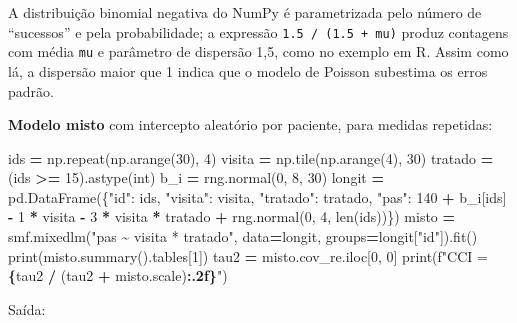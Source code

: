 \documentclass[
]{book}
\newenvironment{Shaded}{\begin{snugshade}}{\end{snugshade}}
\newcommand{\BuiltInTok}[1]{#1}
\newcommand{\DecValTok}[1]{\textcolor[rgb]{0.00,0.00,0.81}{#1}}
\newcommand{\NormalTok}[1]{#1}
\newcommand{\OperatorTok}[1]{\textcolor[rgb]{0.81,0.36,0.00}{\textbf{#1}}}
\newcommand{\SpecialCharTok}[1]{\textcolor[rgb]{0.81,0.36,0.00}{\textbf{#1}}}
\newcommand{\SpecialStringTok}[1]{\textcolor[rgb]{0.31,0.60,0.02}{#1}}
\newcommand{\StringTok}[1]{\textcolor[rgb]{0.31,0.60,0.02}{#1}}
\begin{document}
A distribuição binomial negativa do NumPy é parametrizada pelo número de ``sucessos'' e pela probabilidade; a expressão \texttt{1.5\ /\ (1.5\ +\ mu)} produz contagens com média \texttt{mu} e parâmetro de dispersão 1,5, como no exemplo em R. Assim como lá, a dispersão maior que 1 indica que o modelo de Poisson subestima os erros padrão.

\textbf{Modelo misto} com intercepto aleatório por paciente, para medidas repetidas:

\begin{Shaded}
\begin{Highlighting}[]
\NormalTok{ids }\OperatorTok{=}\NormalTok{ np.repeat(np.arange(}\DecValTok{30}\NormalTok{), }\DecValTok{4}\NormalTok{)}
\NormalTok{visita }\OperatorTok{=}\NormalTok{ np.tile(np.arange(}\DecValTok{4}\NormalTok{), }\DecValTok{30}\NormalTok{)}
\NormalTok{tratado }\OperatorTok{=}\NormalTok{ (ids }\OperatorTok{\textgreater{}=} \DecValTok{15}\NormalTok{).astype(}\BuiltInTok{int}\NormalTok{)}
\NormalTok{b\_i }\OperatorTok{=}\NormalTok{ rng.normal(}\DecValTok{0}\NormalTok{, }\DecValTok{8}\NormalTok{, }\DecValTok{30}\NormalTok{)}
\NormalTok{longit }\OperatorTok{=}\NormalTok{ pd.DataFrame(\{}\StringTok{"id"}\NormalTok{: ids, }\StringTok{"visita"}\NormalTok{: visita, }\StringTok{"tratado"}\NormalTok{: tratado,}
                       \StringTok{"pas"}\NormalTok{: }\DecValTok{140} \OperatorTok{+}\NormalTok{ b\_i[ids] }\OperatorTok{{-}} \DecValTok{1} \OperatorTok{*}\NormalTok{ visita }\OperatorTok{{-}} \DecValTok{3} \OperatorTok{*}\NormalTok{ visita }\OperatorTok{*}\NormalTok{ tratado}
                              \OperatorTok{+}\NormalTok{ rng.normal(}\DecValTok{0}\NormalTok{, }\DecValTok{4}\NormalTok{, }\BuiltInTok{len}\NormalTok{(ids))\})}
\NormalTok{misto }\OperatorTok{=}\NormalTok{ smf.mixedlm(}\StringTok{"pas \textasciitilde{} visita * tratado"}\NormalTok{, data}\OperatorTok{=}\NormalTok{longit, groups}\OperatorTok{=}\NormalTok{longit[}\StringTok{"id"}\NormalTok{]).fit()}
\BuiltInTok{print}\NormalTok{(misto.summary().tables[}\DecValTok{1}\NormalTok{])}
\NormalTok{tau2 }\OperatorTok{=}\NormalTok{ misto.cov\_re.iloc[}\DecValTok{0}\NormalTok{, }\DecValTok{0}\NormalTok{]}
\BuiltInTok{print}\NormalTok{(}\SpecialStringTok{f"CCI = }\SpecialCharTok{\{}\NormalTok{tau2 }\OperatorTok{/}\NormalTok{ (tau2 }\OperatorTok{+}\NormalTok{ misto.scale)}\SpecialCharTok{:.2f\}}\SpecialStringTok{"}\NormalTok{)}
\end{Highlighting}
\end{Shaded}

Saída:
\end{document}
